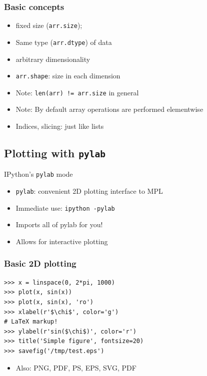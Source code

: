 \documentclass[14pt,compress]{beamer}
\newcounter{time}
\newcommand{\inctime}[1]{\addtocounter{time}{#1}{\tiny \thetime\ m}}
\newcommand{\typ}[1]{\texttt{#1}}
\begin{document}
\begin{frame}
  \frametitle{Basic concepts}
  \begin{itemize}
  \item fixed size (\typ{arr.size});
  \item Same type (\typ{arr.dtype}) of data
  \item arbitrary dimensionality
  \item \typ{arr.shape}: size in each dimension
  \item \alert{Note:} \typ{len(arr) != arr.size} in general
  \item \alert{Note:} By default array operations are performed
    \alert{elementwise}
  \item Indices, slicing: just like lists 
  \end{itemize}
\end{frame}





\subsection{Plotting with \typ{pylab}}

\begin{frame}
    {IPython's \typ{pylab} mode}
\begin{itemize}
    \item \typ{pylab}: convenient 2D plotting interface to MPL
    \item Immediate use: \typ{ipython -pylab}
    \item Imports all of pylab for you!
    \item Allows for interactive plotting
\end{itemize}
\end{frame}

\begin{frame}[fragile]
    \frametitle{Basic 2D plotting}

\begin{lstlisting}
>>> x = linspace(0, 2*pi, 1000)
>>> plot(x, sin(x)) 
>>> plot(x, sin(x), 'ro')
>>> xlabel(r'$\chi$', color='g')
# LaTeX markup!
>>> ylabel(r'sin($\chi$)', color='r')
>>> title('Simple figure', fontsize=20)
>>> savefig('/tmp/test.eps')
\end{lstlisting}
\begin{itemize}
  \item Also: PNG, PDF, PS, EPS, SVG, PDF
\end{itemize}
\end{frame}
       
\end{document}
